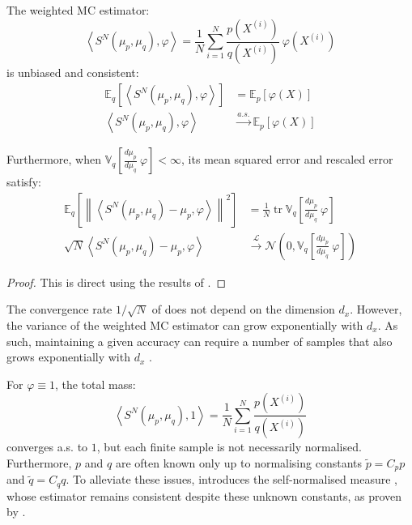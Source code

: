 \begin{proposition}\label{th:weighted_MC}
	The weighted MC estimator:
	\begin{equation}
		\left\langle S^N(\mu_p,\mu_q),\varphi\right\rangle=\frac{1}{N}\sum_{i=1}^N\frac{p\left(X^{(i)}\right)}{q\left(X^{(i)}\right)}\:\varphi\left(X^{(i)}\right)
	\end{equation}
	is unbiased and consistent:
	\begin{align}
		\mathbb{E}_q\left[\left\langle S^N(\mu_p,\mu_q),\varphi\right\rangle\right]&=\mathbb{E}_p[\varphi(X)]\\
		\left\langle S^N(\mu_p,\mu_q),\varphi\right\rangle&\overset{a.s.}{\longrightarrow}\mathbb{E}_p[\varphi(X)]
	\end{align}

	Furthermore, when $\mathbb{V}_q\!\left[\frac{d\mu_p}{d\mu_q}\:\varphi\right]<\infty$, its mean squared error and rescaled error satisfy:
	\begin{align}
		\mathbb{E}_q\left[\left\|\left\langle S^N(\mu_p,\mu_q)-\mu_p,\varphi\right\rangle\right\|^2\right]&=\frac{1}{N}\operatorname{tr}\mathbb{V}_q\left[\frac{d\mu_p}{d\mu_q}\:\varphi\right]\\
		\sqrt{N}\left\langle S^N(\mu_p,\mu_q)-\mu_p,\varphi\right\rangle&\overset{\mathcal{L}}{\longrightarrow}\mathcal{N}\left(0,\mathbb{V}_q\left[\frac{d\mu_p}{d\mu_q}\:\varphi\right]\right)
	\end{align}
\end{proposition}

\begin{proof}
	This is direct using the results of .
\end{proof}

\begin{remark}
	The convergence rate $1/\sqrt{N}$ of  does not depend on the dimension $d_x$. However, the variance of the weighted MC estimator can grow exponentially with $d_x$. As such, maintaining a given accuracy can require a number of samples that also grows exponentially with $d_x$ \cite{bib:PF-dimension}.
\end{remark}

For $\varphi\equiv1$, the total mass:
\begin{equation}
	\left\langle S^N(\mu_p,\mu_q),1\right\rangle=\frac{1}{N}\sum_{i=1}^N\frac{p\left(X^{(i)}\right)}{q\left(X^{(i)}\right)}
\end{equation}
converges a.s. to $1$, but each finite sample is not necessarily normalised. Furthermore, $p$ and $q$ are often known only up to normalising constants $\tilde{p}=C_p p$ and $\tilde{q}=C_q q$. To alleviate these issues,  introduces the self-normalised measure \cite{bib:self-normalised}, whose estimator remains consistent despite these unknown constants, as proven by .

